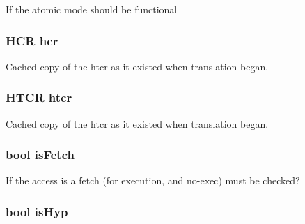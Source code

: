 \label{classArmISA_1_1TableWalker_1_1WalkerState_a4f60754b74e2d1584c06199ae5b75f21}
If the atomic mode should be functional \hypertarget{classArmISA_1_1TableWalker_1_1WalkerState_ad0d8df2e2be956266458221c23763b4c}{
\subsubsection[{hcr}]{\setlength{\rightskip}{0pt plus 5cm}HCR {\bf hcr}}}
\label{classArmISA_1_1TableWalker_1_1WalkerState_ad0d8df2e2be956266458221c23763b4c}
Cached copy of the htcr as it existed when translation began. \hypertarget{classArmISA_1_1TableWalker_1_1WalkerState_a1ee934c0734a2ed4bd4d867f55aa3d97}{
\subsubsection[{htcr}]{\setlength{\rightskip}{0pt plus 5cm}HTCR {\bf htcr}}}
\label{classArmISA_1_1TableWalker_1_1WalkerState_a1ee934c0734a2ed4bd4d867f55aa3d97}
Cached copy of the htcr as it existed when translation began. \hypertarget{classArmISA_1_1TableWalker_1_1WalkerState_aa863dbd5a3e20baa5acb07e373c42ddc}{
\subsubsection[{isFetch}]{\setlength{\rightskip}{0pt plus 5cm}bool {\bf isFetch}}}
\label{classArmISA_1_1TableWalker_1_1WalkerState_aa863dbd5a3e20baa5acb07e373c42ddc}
If the access is a fetch (for execution, and no-\/exec) must be checked? \hypertarget{classArmISA_1_1TableWalker_1_1WalkerState_a104c09577173edc4f8ce6814cc33f0ae}{
\subsubsection[{isHyp}]{\setlength{\rightskip}{0pt plus 5cm}bool {\bf isHyp}}}
